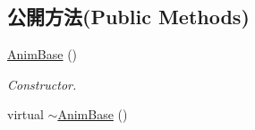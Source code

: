 \subsection*{公開方法(Public Methods)}
\begin{DoxyCompactItemize}
\item 
\hyperlink{class_i_dream_sky_1_1_anim_base_a969a9ef36c4fef41b9ea824660248abf}{Anim\+Base} ()\hypertarget{class_i_dream_sky_1_1_anim_base_a969a9ef36c4fef41b9ea824660248abf}{}\label{class_i_dream_sky_1_1_anim_base_a969a9ef36c4fef41b9ea824660248abf}

\begin{DoxyCompactList}\small\item\em Constructor. \end{DoxyCompactList}\item 
virtual \hyperlink{class_i_dream_sky_1_1_anim_base_a1edaa0c3b82c3b5d22a3c9d21a9840b8}{$\sim$\+Anim\+Base} ()\hypertarget{class_i_dream_sky_1_1_anim_base_a1edaa0c3b82c3b5d22a3c9d21a9840b8}{}\label{class_i_dream_sky_1_1_anim_base_a1edaa0c3b82c3b5d22a3c9d21a9840b8}


\end{DoxyCompactItemize}
